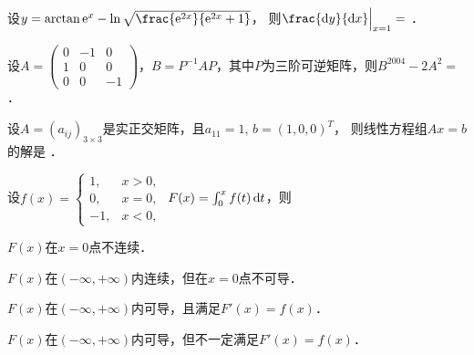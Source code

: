 \documentclass[plain,noanswer,medmath]{../../template/jnuexam}
\begin{document}








\begin{problem}
设$y = \arctan \e^x - \ln \sqrt{\frac{\e^{2x}}{\e^{2x} + 1}}$，
则$\frac{\dy}{\dx}\Big|_{x = 1} =$ \fillin{}．
\end{problem}




\begin{problem}
设$A = \begin{pmatrix}
  0 & -1 & 0 \\
  1 &  0 & 0 \\
  0 &  0 & -1
\end{pmatrix}$，$B = P^{-1} AP$，其中$P$为三阶可逆矩阵，则$B^{2004} - 2A^2 =$ \fillin{}．
\end{problem}


\begin{problem}
设$A = (a_{ij})_{3 \times 3}$是实正交矩阵，且$a_{11} = 1$, $b = (1,0,0)^T$，
则线性方程组$Ax = b$的解是 \fillin{}．
\end{problem}












\begin{problem}
设$f(x) = \begin{cases}
   1, & x > 0, \\
   0, & x = 0, \\
  -1, & x < 0,
\end{cases}$ $F(x) = \int_0^x f(t)\mathop{}\!\mathrm{d} t$，则\pickout{}
\begin{abcd}
\item $F(x)$在$x = 0$点不连续．
\item $F(x)$在$(-\infty , +\infty)$内连续，但在$x = 0$点不可导．
\item $F(x)$在$(-\infty , +\infty)$内可导，且满足$F'(x) = f(x)$．
\item $F(x)$在$(-\infty , +\infty)$内可导，但不一定满足$F'(x) = f(x)$．
\end{abcd}
\end{problem}
\end{document}

